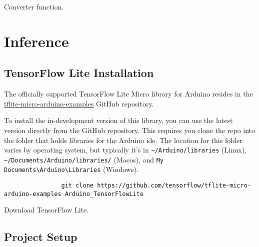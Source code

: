 \documentclass[aspectratio=169]{beamer}
\begin{document}
\begin{frame}
    \begin{listing}[H]
        \caption{Converter function.}
        \label{lst:tflite:sinewave:tflite_model:c:converter}
    \end{listing}
\end{frame}

\section{Inference}

\subsection{TensorFlow Lite Installation}

\begin{frame}[fragile]
    \par The officially supported TensorFlow Lite Micro library for Arduino\textregistered{} resides in the \href{https://github.com/tensorflow/tflite-micro-arduino-examples}{tflite-micro-arduino-examples} GitHub repository.
    \par To install the in-development version of this library, you can use the latest version directly from the GitHub repository.
    This requires you clone the repo into the folder that holds libraries for the Arduino\textregistered{} \acs{ide}.
    The location for this folder varies by operating system, but typically it's in \texttt{\textasciitilde{}/Arduino/libraries} (Linux), \texttt{\textasciitilde{}/Documents/Arduino/libraries/} (Mac\acs{os}), and \texttt{My Documents\textbackslash{}Arduino\textbackslash{}Libraries} (Windows).
    \begin{listing}[H]
        \begin{mdframed}
            \begin{verbatim}
                git clone https://github.com/tensorflow/tflite-micro-arduino-examples Arduino_TensorFlowLite
            \end{verbatim}
        \end{mdframed}
        \caption{Download TensorFlow Lite.}
        \label{lst:tflite:installation}
    \end{listing}
\end{frame}

\subsection{Project Setup}
\end{document}
